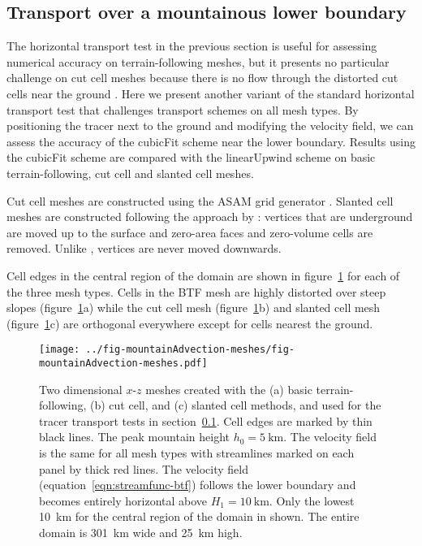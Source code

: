 \subsection{Transport over a mountainous lower boundary}
\label{sec:mountainAdvection}

The horizontal transport test in the previous section is useful for assessing numerical accuracy on terrain-following meshes, but it presents no particular challenge on cut cell meshes because there is no flow through the distorted cut cells near the ground \citep{good2014}.
Here we present another variant of the standard horizontal transport test that challenges transport schemes on all mesh types.  By positioning the tracer next to the ground and modifying the velocity field, we can assess the accuracy of the cubicFit scheme near the lower boundary.  Results using the cubicFit scheme are compared with the linearUpwind scheme on basic terrain-following, cut cell and slanted cell meshes.


Cut cell meshes are constructed using the ASAM grid generator \citep{jaehn2015,asam2010}.  Slanted cell meshes are constructed following the approach by \citep{shaw-weller2016}: vertices that are underground are moved up to the surface and zero-area faces and zero-volume cells are removed.  Unlike \citep{shaw-weller2016}, vertices are never moved downwards.

Cell edges in the central region of the domain are shown in figure~\ref{fig:mountainAdvection-meshes} for each of the three mesh types.
Cells in the BTF mesh are highly distorted over steep slopes (figure~\ref{fig:mountainAdvection-meshes}a) while the cut cell mesh (figure~\ref{fig:mountainAdvection-meshes}b) and slanted cell mesh (figure~\ref{fig:mountainAdvection-meshes}c) are orthogonal everywhere except for cells nearest the ground.

\begin{figure}
	\centering
	\texttt{[image: ../fig-mountainAdvection-meshes/fig-mountainAdvection-meshes.pdf]}
	\caption{Two dimensional $x$-$z$ meshes created with the (a) basic terrain-following, (b) cut cell, and (c) slanted cell methods, and used for the tracer transport tests in section~\ref{sec:mountainAdvection}.  Cell edges are marked by thin black lines.  The peak mountain height $h_0 = \SI{5}{\kilo\meter}$.
The velocity field is the same for all mesh types with streamlines marked on each panel by thick red lines.  The velocity field (equation~\ref{eqn:streamfunc-btf}) follows the lower boundary and becomes entirely horizontal above $H_1 = \SI{10}{\kilo\meter}$.
Only the lowest \SI{10}{\kilo\meter} for the central region of the domain in shown.  The entire domain is \SI{301}{\kilo\meter} wide and \SI{25}{\kilo\meter} high.}
	\label{fig:mountainAdvection-meshes}
\end{figure}

